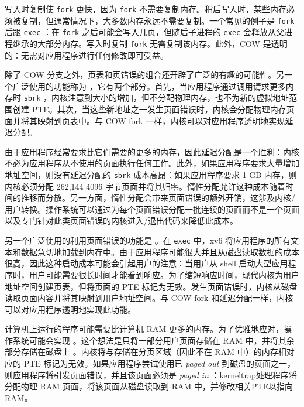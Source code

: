 写入时复制使    \lstinline{fork}    更快，因为    \lstinline{fork}    不需要复制内存。稍后写入时，某些内存必须被复制，但通常情况下，大多数内存永远不需要复制。一个常见的例子是
    \lstinline{fork}    后跟    \lstinline{exec}    ：在    \lstinline{fork}    之后可能会写入几页，但随后子进程的    \lstinline{exec}    会释放从父进程继承的大部分内存。写入时复制    \lstinline{fork}    无需复制该内存。此外，COW 是透明的：无需对应用程序进行任何修改即可受益。  

除了 COW 分支之外，页表和页错误的组合还开辟了广泛的有趣的可能性。另一个广泛使用的功能称为        ，它有两个部分。首先，当应用程序通过调用请求更多内存时
    \lstinline{sbrk}    ，内核注意到大小的增加，但不分配物理内存，也不为新的虚拟地址范围创建 PTE。其次，当这些新地址之一发生页面错误时，内核会分配物理内存页面并将其映射到页表中。与 COW fork 一样，内核可以对应用程序透明地实现延迟分配。  

由于应用程序经常要求比它们需要的更多的内存，因此延迟分配是一个胜利：内核不必为应用程序从不使用的页面执行任何工作。此外，如果应用程序要求大量增加地址空间，则没有延迟分配的    \lstinline{sbrk}    成本高昂：如果应用程序要求 1 GB 内存，则内核必须分配 262,144 4096 字节页面并将其归零。惰性分配允许这种成本随着时间的推移而分散。另一方面，惰性分配会带来页面错误的额外开销，这涉及内核/用户转换。操作系统可以通过为每个页面错误分配一批连续的页面而不是一个页面以及专门针对此类页面错误的内核进入/退出代码来降低此成本。  

另一个广泛使用的利用页面错误的功能是
        。在    \lstinline{exec}    中，xv6 将应用程序的所有文本和数据急切地加载到内存中。由于应用程序可能很大并且从磁盘读取数据的成本很高，因此这种启动成本可能会引起用户的注意：当用户从 shell 启动大型应用程序时，用户可能需要很长时间才能看到响应。为了缩短响应时间，现代内核为用户地址空间创建页表，但将页面的 PTE 标记为无效。发生页面错误时，内核从磁盘读取页面内容并将其映射到用户地址空间。与 COW fork 和延迟分配一样，内核可以对应用程序透明地实现此功能。  

计算机上运行的程序可能需要比计算机 RAM 更多的内存。为了优雅地应对，操作系统可能会实现        。这个想法是只将一部分用户页面存储在 RAM 中，并将其余部分存储在磁盘上
        。内核将与存储在分页区域（因此不在 RAM 中）的内存相对应的 PTE 标记为无效。如果应用程序尝试使用已  {    \it    paged out   }  到磁盘的页面之一，则应用程序将引发页面错误，并且该页面必须是  {    \it    paged in   }  ：kerneltrap处理程序将分配物理 RAM 页面，将该页面从磁盘读取到 RAM 中，并修改相关PTE以指向RAM。  

